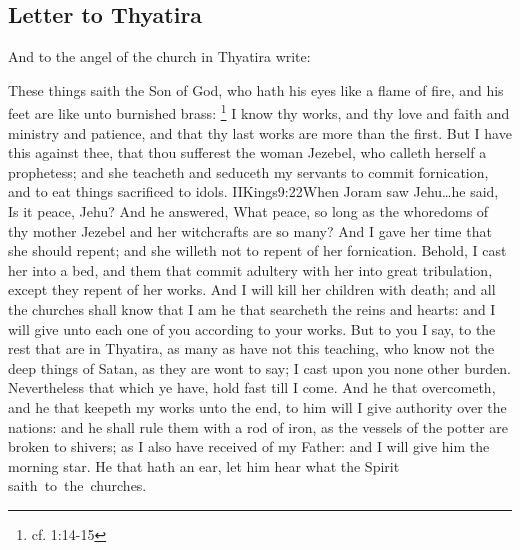 \subsection*{Letter to Thyatira}
And to the angel of the church in Thyatira write:

These things saith the Son of God, who hath his eyes like a flame of fire, and his feet are like unto burnished brass:%
	\footnote{cf. 1:14-15} %
I know thy works, and thy love and faith and ministry and patience, and that thy last works are more than the first. %
But I have this against thee, that thou sufferest the woman Jezebel, who calleth herself a prophetess; and she teacheth and seduceth my servants to commit fornication, and to eat things sacrificed to idols.%
				 {IIKings}{9:22}{When Joram saw Jehu\ldots he said, Is it peace, Jehu? And he answered, What peace, so long as the whoredoms of thy mother Jezebel and her witchcrafts are so many?} %
And I gave her time that she should repent; and she willeth not to repent of her fornication. %
Behold, I cast her into a bed, and them that commit adultery with her into great tribulation, except they repent of her works. %
And I will kill her children with death; and all the churches shall know that I am he that searcheth the reins and hearts:%
and I will give unto each one of you according to your works. %
But to you I say, to the rest that are in Thyatira, as many as have not this teaching, who know not the deep things of Satan, as they are wont to say; I cast upon you none other burden. %
Nevertheless that which ye have, hold fast till I come. %
And he that overcometh, and he that keepeth my works unto the end, to him will I give authority over the nations: %
and he shall rule them with a rod of iron, as the vessels of the potter are broken to shivers;%
as I also have received of my Father: %
and I will give him the morning star. %
He that hath an ear, let him hear what the Spirit saith~to~the~churches.
